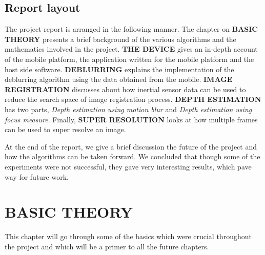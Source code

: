 \documentclass[BTech]{iitmdiss}
\begin{document}
\section{Report layout}
\label{intro:layout}
The project report is arranged in the following manner. The chapter on 
\textbf{BASIC THEORY} presents a brief background of the various algorithms
and the mathematics involved in the project. \textbf{THE DEVICE} gives an
in-depth account of the mobile platform, the application written for the
mobile platform and the host side software. \textbf{DEBLURRING} 
explains the implementation of the deblurring algorithm using the data
obtained from the mobile. \textbf{IMAGE REGISTRATION} discusses about how
inertial sensor data can be used to reduce the search space of image 
registration process. \textbf{DEPTH ESTIMATION} has two parts, 
\emph{Depth estimation using motion blur} and \emph{Depth estimation 
using focus measure}. Finally, \textbf{SUPER RESOLUTION} looks at how 
multiple frames can be used to super resolve an image.

At the end of the report, we give a brief discussion the future of the 
project and how the algorithms can be taken forward. We concluded that
though some of the experiments were not successful, they gave very
interesting results, which pave way for future work.

\chapter{BASIC THEORY}
\label{chap:basic_theory}
This chapter will go through some of the basics which were crucial 
throughout the project and which will be a primer to all the future 
chapters.
\end{document}

